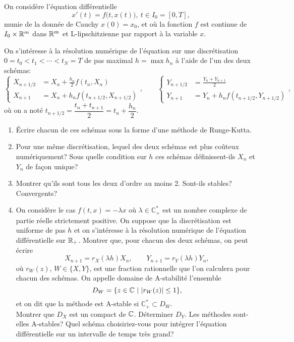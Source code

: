 \documentclass[a4paper,12pt,reqno]{amsart}
\begin{document}
\begin{exo}
\end{exo}

\begin{exo}

  On considère l'équation différentielle
    \[
      x'(t) = f\big(t,x(t)\big),\ t\in I_0= [0,T],
    \]
  munie de la donnée de Cauchy $x(0) = x_0$, et où la fonction $f$ est continue de $I_0\times\mathbb{R}^m$ dans $\mathbb{R}^m$ et L-lipschitzienne par rapport à la variable $x$.

  On s'intéresse à la résolution numérique de l'équation sur une discrétisation  $0=t_0< t_1<\cdots< t_N = T$ de pas maximal $h=\max h_n$ à l'aide de l'un des deux schémas:
  \[
    \left\{
      \begin{aligned}
        X_{n+1/2} &= X_n +\frac{h_n}{2} f(t_{n}, X_{n}) \\
        X_{n+1}   &= X_n +{h_n} f(t_{n+1/2}, X_{n+1/2})
      \end{aligned}
    \right.,
    \qquad
    \left\{
      \begin{aligned}
        Y_{n+1/2} &= \frac{Y_n +Y_{n+1}}{2} \\
        Y_{n+1}   &= Y_n + h_n f(t_{n+1/2}, Y_{n+1/2})
      \end{aligned}
    \right.,
  \]
  où on a noté $t_{n+1/2} = \dfrac{t_n +t_{n+1}}{2} =t_n +  \dfrac{h_n}{2}$.

  \begin{enumerate}
    \item Écrire  chacun de  ces  schémas sous la forme d'une méthode de Runge-Kutta.

    \item Pour une même discrétisation, lequel des deux schémas est plus coûteux numériquement? Sous quelle condition sur $h$ ces schémas définissent-ils $X_n$ et $Y_n$ de façon unique?

    \item Montrer qu'ils sont tous les deux d'ordre au moins 2. Sont-ils stables? Convergents?

    \item On considère le cas $f(t,x) = -\lambda x$ où $\lambda \in \mathbb{C}_{+}^{*}$ est un nombre complexe de partie réelle strictement positive. On suppose que la discrétisation est uniforme de pas $h$ et on s'intéresse à la résolution numérique de l'équation différentielle sur $\mathbb{R}_+$. Montrer que, pour chacun des deux schémas, on peut écrire
      \[
        X_{n+1} = r_X(\lambda h) X_n,\qquad Y_{n+1} = r_Y(\lambda h) Y_n,
      \]
    où $r_{W}(z)$, $W\in\{X,Y\}$, est une fraction rationnelle que l'on calculera pour chacun des schémas. On appelle domaine de A-stabilité l'ensemble
      \[
        D_{W}=\{z\in\mathbb{C}\ |\ |r_{W}(z)|\leq 1\},
      \]
    et on dit que la méthode est A-stable si $\mathbb{C}_{+}^{*}\subset D_{W}$.\\
    Montrer que $D_X$ est un compact de $\mathbb{C}$. Déterminer $D_Y$. Les méthodes sont-elles A-stables? Quel schéma choisiriez-vous pour  intégrer l'équation différentielle sur un intervalle de temps très grand?


\end{enumerate}
\end{exo}
\end{document}
